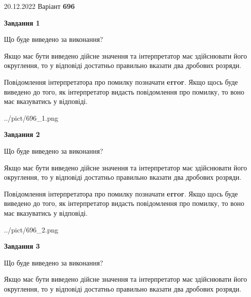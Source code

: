 \documentclass[12pt, ukrainian]{article}
\begin{document}
{20.12.2022 Варіант \No \textbf { 696 }\par}
{
\begin {Large}

{\begin {center}\textbf{Завдання 1}\end {center}}\par
Що буде виведено за виконання? \par

Якщо має бути виведено дійсне значення та інтерпретатор має здійснювати його округлення, 
то у відповіді достатньо правильно вказати два дробових розряди.

Повідомлення інтерпретатора про помилку позначати \textbf{error}.
Якщо щось буде виведено до того, як інтерпретатор видасть повідомлення про помилку, 
то воно має вказуватись у відповіді. \par

\begin{center}
	{../pict/696_1.png}
\end{center}
\newpage

{\begin {center}\textbf{Завдання 2}\end {center}}\par
Що буде виведено за виконання? \par

Якщо має бути виведено дійсне значення та інтерпретатор має здійснювати його округлення, 
то у відповіді достатньо правильно вказати два дробових розряди.

Повідомлення інтерпретатора про помилку позначати \textbf{error}.
Якщо щось буде виведено до того, як інтерпретатор видасть повідомлення про помилку, 
то воно має вказуватись у відповіді. \par

\begin{center}
	{../pict/696_2.png}
\end{center}
\newpage

{\begin {center}\textbf{Завдання 3}\end {center}}\par
Що буде виведено за виконання? \par

Якщо має бути виведено дійсне значення та інтерпретатор має здійснювати його округлення, 
то у відповіді достатньо правильно вказати два дробових розряди.


\end{Large}}
\end{document}
